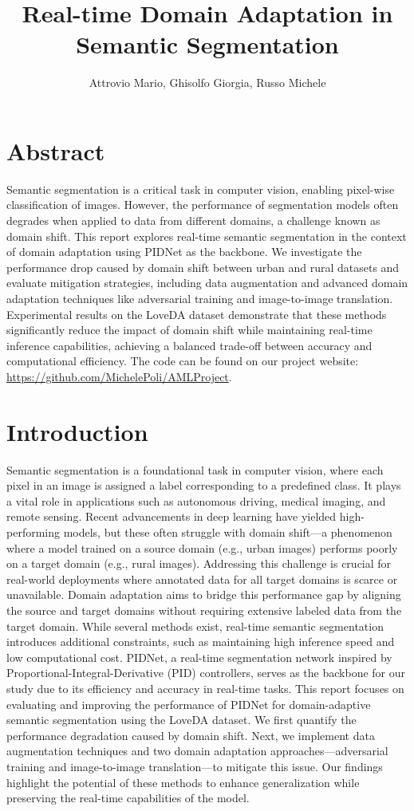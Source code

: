 \documentclass{article}
\title{Real-time Domain Adaptation in
Semantic Segmentation}
\author{Attrovio Mario, Ghisolfo Giorgia, Russo Michele}
\begin{document}
\maketitle


\begin{multicols}{2}
    \section{Abstract}
Semantic segmentation is a critical task in computer vision, enabling pixel-wise classification of images. However, the performance of segmentation models often degrades when applied to data from different domains, a challenge known as domain shift. This report explores real-time semantic segmentation in the context of domain adaptation using PIDNet as the backbone. We investigate the performance drop caused by domain shift between urban and rural datasets and evaluate mitigation strategies, including data augmentation and advanced domain adaptation techniques like adversarial training and image-to-image translation. Experimental results on the LoveDA dataset demonstrate that these methods significantly reduce the impact of domain shift while maintaining real-time inference capabilities, achieving a balanced trade-off between accuracy and computational efficiency.
The code can be found on our project website: 
\url{https://github.com/MichelePoli/AMLProject}.

    
    \section{Introduction}
Semantic segmentation is a foundational task in computer vision, where each pixel in an image is assigned a label corresponding to a predefined class. It plays a vital role in applications such as autonomous driving, medical imaging, and remote sensing. Recent advancements in deep learning have yielded high-performing models, but these often struggle with domain shift—a phenomenon where a model trained on a source domain (e.g., urban images) performs poorly on a target domain (e.g., rural images). Addressing this challenge is crucial for real-world deployments where annotated data for all target domains is scarce or unavailable.
Domain adaptation aims to bridge this performance gap by aligning the source and target domains without requiring extensive labeled data from the target domain. While several methods exist, real-time semantic segmentation introduces additional constraints, such as maintaining high inference speed and low computational cost. PIDNet, a real-time segmentation network inspired by Proportional-Integral-Derivative (PID) controllers, serves as the backbone for our study due to its efficiency and accuracy in real-time tasks.
This report focuses on evaluating and improving the performance of PIDNet for domain-adaptive semantic segmentation using the LoveDA dataset. We first quantify the performance degradation caused by domain shift. Next, we implement data augmentation techniques and two domain adaptation approaches—adversarial training and image-to-image translation—to mitigate this issue. Our findings highlight the potential of these methods to enhance generalization while preserving the real-time capabilities of the model.


\end{multicols}
\end{document}
